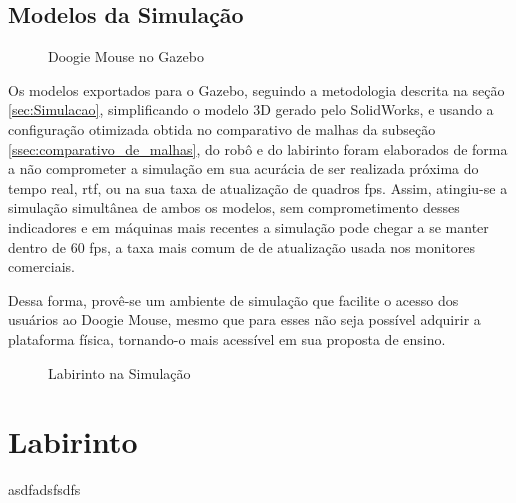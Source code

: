 \subsection{Modelos da Simulação}
\label{sec:modelos_sim}
\begin{figure}[H]
	\centering
	\caption{Doogie Mouse no Gazebo}
	\label{fig:doogie_gazebo_imgs}
\end{figure}
Os modelos exportados para o Gazebo, seguindo a metodologia descrita na seção \ref{sec:Simulacao}, simplificando o modelo 3D gerado pelo SolidWorks, e usando a configuração otimizada obtida no comparativo de malhas da subseção \ref{ssec:comparativo_de_malhas}, do robô e do labirinto foram elaborados de forma a não comprometer a simulação em sua acurácia de ser realizada próxima do tempo real, \gls*{rtf}, ou na sua taxa de atualização de quadros \gls*{fps}. Assim, atingiu-se a simulação simultânea de ambos os modelos, sem comprometimento desses indicadores e em máquinas mais recentes a simulação pode chegar a se manter dentro de 60 \gls*{fps}, a taxa mais comum de de atualização usada nos monitores comerciais.

Dessa forma, provê-se um ambiente de simulação que facilite o acesso dos usuários ao Doogie Mouse, mesmo que para esses não seja possível adquirir a plataforma física, tornando-o mais acessível em sua proposta de ensino.



\label{sec:modelos_sim}
\begin{figure}[H]
	\centering
	\caption{Labirinto na Simulação}
	\label{fig:minus_gazebo_imgs}
\end{figure}


\section{Labirinto}
\label{sec:resultado_labirinto}
asdfadsfsdfs

